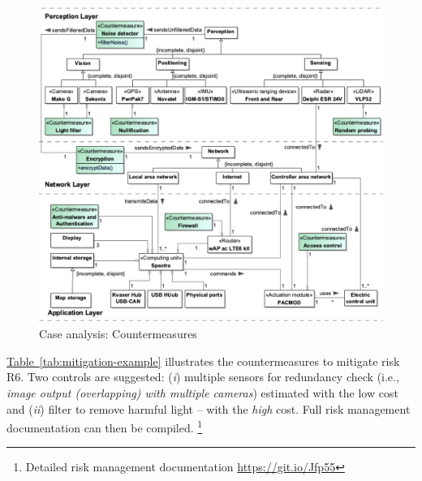 \documentclass[runningheads]{llncs}
\begin{document}
\begin{figure}[h!]
  \centering
  \includegraphics[width=0.8\linewidth]{caseCount}
  \caption{Case analysis: Countermeasures} 
  \label{fig:Count}
  \vspace{-15pt}
\end{figure}

\hyperref[tab:mitigation-example]{Table~\ref{tab:mitigation-example}} illustrates the countermeasures to mitigate risk R6. Two controls are suggested: (\textit{i}) multiple sensors for redundancy check (i.e., \textit{image output (overlapping) with multiple cameras}) estimated with the low cost and (\textit{ii}) filter to remove harmful light -- with the \textit{high} cost. Full risk management documentation can then be compiled. \footnote{Detailed risk management documentation \url{https://git.io/Jfp55}}
%
\end{document}
